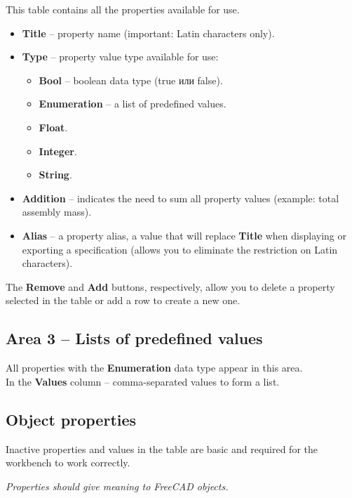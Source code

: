 \documentclass[a4paper,12pt]{article}
\begin{document}
This table contains all the properties available for use.
\begin{itemize}
	\item \textbf{Title} -- property name (important: Latin characters only).
	\item \textbf{Type} -- property value type available for use:
	\begin{itemize}
		\item \textbf{Bool} -- boolean data type (true или false).
		\item \textbf{Enumeration} -- a list of predefined values.
		\item \textbf{Float}.
		\item \textbf{Integer}.
		\item \textbf{String}.
	\end{itemize}
	\item \textbf{Addition} -- indicates the need to sum all property values ​​(example: total assembly mass).
	\item \textbf{Alias} -- a property alias, a value that will replace \textbf{Title} when displaying or exporting a specification (allows you to eliminate the restriction on Latin characters).
\end{itemize}

\begin{flushleft}The \textbf{Remove} and \textbf{Add} buttons, respectively, allow you to delete a property selected in the table or add a row to create a new one.\end{flushleft}

\subsection{Area 3 -- Lists of predefined values}
All properties with the \textbf{Enumeration} data type appear in this area.\\In the \textbf{Values} ​​column -- comma-separated values ​​to form a list.


\subsection{Object properties}

Inactive properties and values ​​in the table are basic and required for the workbench to work correctly.

\begin{center}\emph{Properties should give meaning to FreeCAD objects.}\end{center}
\end{document}
